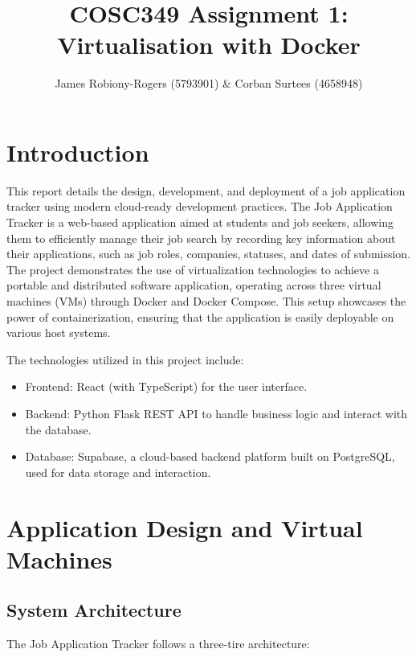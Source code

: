 \documentclass[a4paper, 11pt]{article}
\title{COSC349 Assignment 1: Virtualisation with Docker}
\author{James Robiony-Rogers (5793901) \& Corban Surtees (4658948)}
\begin{document}
\begin{titlepage}
    \maketitle
    \vfill
    \tableofcontents
\end{titlepage}

\pagebreak

\section{Introduction}

This report details the design, development, and deployment of a job application tracker using modern cloud-ready development practices. The Job Application Tracker is a web-based application aimed at students and job seekers, allowing them to efficiently manage their job search by recording key information about their applications, such as job roles, companies, statuses, and dates of submission. The project demonstrates the use of virtualization technologies to achieve a portable and distributed software application, operating across three virtual machines (VMs) through Docker and Docker Compose. This setup showcases the power of containerization, ensuring that the application is easily deployable on various host systems.

The technologies utilized in this project include:

\begin{itemize}
    \item Frontend: React (with TypeScript) for the user interface.
    \item Backend: Python Flask REST API to handle business logic and interact with the database.
    \item Database: Supabase, a cloud-based backend platform built on PostgreSQL, used for data storage and interaction.
\end{itemize}


\section{Application Design and Virtual Machines}

\subsection*{System Architecture}
The Job Application Tracker follows a three-tire architecture:
\end{document}
